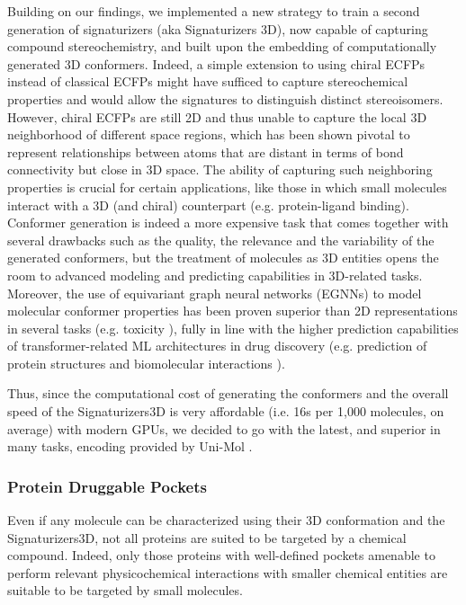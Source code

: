Building on our findings, we implemented a new strategy to train a second generation of signaturizers (aka Signaturizers 3D), now capable of capturing compound stereochemistry, and built upon the embedding of computationally generated 3D conformers. Indeed, a simple extension to using chiral ECFPs instead of classical ECFPs might have sufficed to capture stereochemical properties and would allow the signatures to distinguish distinct stereoisomers. However, chiral ECFPs are still 2D and thus unable to capture the local 3D neighborhood of different space regions, which has been shown pivotal to represent relationships between atoms that are distant in terms of bond connectivity but close in 3D space\cite{axen_simple_2017}. The ability of capturing such neighboring properties is crucial for certain applications, like those in which small molecules interact with a 3D (and chiral) counterpart (e.g. protein-ligand binding). Conformer generation is indeed a more expensive task that comes together with several drawbacks such as the quality, the relevance and the variability of the generated conformers, but the treatment of molecules as 3D entities opens the room to advanced modeling and predicting capabilities in 3D-related tasks. Moreover, the use of equivariant graph neural networks (EGNNs) to model molecular conformer properties has been proven superior than 2D representations in several tasks (e.g. toxicity \cite{cremer_equivariant_2023}), fully in line with the higher prediction capabilities of transformer-related ML architectures in drug discovery (e.g. prediction of protein structures and biomolecular interactions \cite{jumper_highly_2021, abramson_accurate_2024}).

Thus, since the computational cost of generating the conformers and the overall speed of the Signaturizers3D is very affordable (i.e. 16s per 1,000 molecules, on average) with modern GPUs, we decided to go with the latest, and superior in many tasks, encoding provided by Uni-Mol \cite{zhou_uni-mol_2022}. 

\subsubsection{Protein Druggable Pockets}

Even if any molecule can be characterized using their 3D conformation and the Signaturizers3D, not all proteins are suited to be targeted by a chemical compound. Indeed, only those proteins with well-defined pockets amenable to perform relevant physicochemical interactions with smaller chemical entities are suitable to be targeted by small molecules. 

